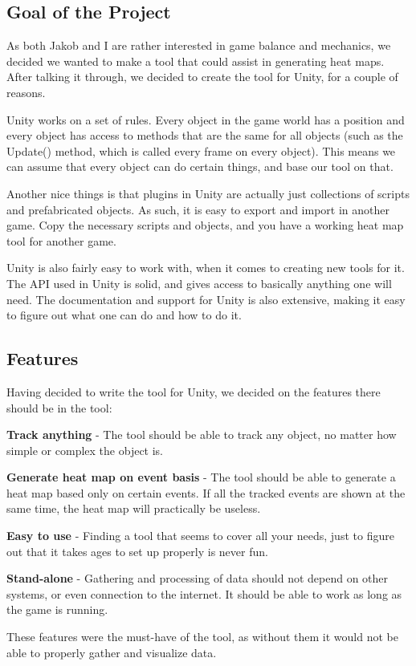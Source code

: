 \subsection{Goal of the Project}
\label{02_01}

As both Jakob and I are rather interested in game balance and mechanics, we decided we wanted to make a tool that could assist in generating heat maps. After talking it through, we decided to create the tool for Unity, for a couple of reasons.

Unity works on a set of rules. Every object in the game world has a position and every object has access to methods that are the same for all objects (such as the Update() method, which is called every frame on every object). This means we can assume that every object can do certain things, and base our tool on that.

Another nice things is that plugins in Unity are actually just collections of scripts and prefabricated objects. As such, it is easy to export and import in another game. Copy the necessary scripts and objects, and you have a working heat map tool for another game.

Unity is also fairly easy to work with, when it comes to creating new tools for it. The API used in Unity is solid, and gives access to basically anything one will need. The documentation and support for Unity is also extensive, making it easy to figure out what one can do and how to do it.

\subsection{Features}
\label{02_02}

Having decided to write the tool for Unity, we decided on the features there should be in the tool:

\begin{my_itemize}

	\item \textbf{Track anything} - The tool should be able to track any object, no matter how simple or complex the object is.

	\item \textbf{Generate heat map on event basis} - The tool should be able to generate a heat map based only on certain events. If all the tracked events are shown at the same time, the heat map will practically be useless.

	\item \textbf{Easy to use} - Finding a tool that seems to cover all your needs, just to figure out that it takes ages to set up properly is never fun.

	\item \textbf{Stand-alone} - Gathering and processing of data should not depend on other systems, or even connection to the internet. It should be able to work as long as the game is running.

\end{my_itemize}

These features were the must-have of the tool, as without them it would not be able to properly gather and visualize data. 